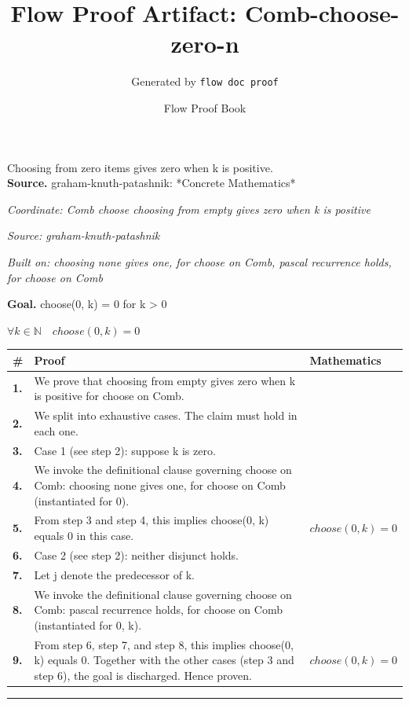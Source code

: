 \documentclass[11pt]{article}
\title{Flow Proof Artifact: Comb-choose-zero-n}
\author{Generated by \texttt{flow doc proof}}
\date{Flow Proof Book}
\theoremstyle{definition}
\begin{document}
\maketitle
Choosing from zero items gives zero when k is positive.\\[0.5em]
\textbf{Source.} graham-knuth-patashnik: *Concrete Mathematics*\\[0.5em]
\bigskip
{}\par
\smallskip\noindent\textit{Coordinate: Comb \cdot choose \cdot choosing from empty gives zero when k is positive}\par
\smallskip\noindent\textit{Source: graham-knuth-patashnik}\par
\smallskip\noindent\textit{Built on: choosing none gives one, for choose on Comb, pascal recurrence holds, for choose on Comb}\par
\medskip
\noindent\textbf{Goal.} choose(0, k) = 0 for k > 0\par
\noindent$\displaystyle \forall k \in \mathbb{N}\quad choose(0, k) = 0$\par
\medskip
\noindent
\begin{tabular}{@{} >{\raggedright\arraybackslash}p{} >{\raggedright\arraybackslash}p{} >{\raggedleft\arraybackslash}p{} @{}}
\textbf{\#} & \textbf{Proof} & \textbf{Mathematics} \\
\midrule
\textbf{1.} & We prove that choosing from empty gives zero when k is positive for choose on Comb. & \\[0.45em]
\textbf{2.} & We split into exhaustive cases. The claim must hold in each one. & \\[0.45em]
\textbf{3.} & Case 1 (see step 2): suppose k is zero. & \\[0.45em]
\textbf{4.} & We invoke the definitional clause governing choose on Comb: choosing none gives one, for choose on Comb (instantiated for 0). & \\[0.45em]
\textbf{5.} & From step 3 and step 4, this implies choose(0, k) equals 0 in this case. & $\displaystyle choose(0, k) = 0$ \\[0.45em]
\textbf{6.} & Case 2 (see step 2): neither disjunct holds. & \\[0.45em]
\textbf{7.} & Let j denote the predecessor of k. & \\[0.45em]
\textbf{8.} & We invoke the definitional clause governing choose on Comb: pascal recurrence holds, for choose on Comb (instantiated for 0, k). & \\[0.45em]
\textbf{9.} & From step 6, step 7, and step 8, this implies choose(0, k) equals 0. Together with the other cases (step 3 and step 6), the goal is discharged. Hence proven. & $\displaystyle choose(0, k) = 0$ \\[0.45em]
\bottomrule
\end{tabular}
\label{thm:Comb-choose-choosing_from_empty_gives_zero_when_k_is_positive}
\par\medskip\hrule
\end{document}
